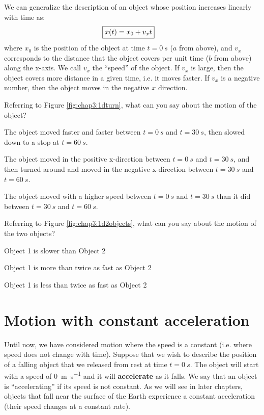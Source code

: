 We can generalize the description of an object whose position increases linearly with time as:
\begin{align}
\label{eqn:chap3:1dxvst_noa}
\Aboxed{x(t) = x_0 + v_xt}
\end{align}
where $x_0$ is the position of the object at time $t=\SI{0}{s}$ ($a$ from above), and $v_x$ corresponds to the distance that the object covers per unit time ($b$ from above) along the x-axis. We call $v_x$ the ``speed'' of the object. If $v_x$ is large, then the object covers more distance in a given time, i.e. it moves faster. If $v_x$ is a negative number, then the object moves in the negative $x$ direction.

\begin{checkpointMC}{Referring to Figure \ref{fig:chap3:1dturn}, what can you say about the motion of the object? }
\item The object moved faster and faster between $t=\SI{0}{s}$ and $t=\SI{30}{s}$, then slowed down to a stop at $t=\SI{60}{s}$.
\item The object moved in the positive x-direction between $t=\SI{0}{s}$ and $t=\SI{30}{s}$, and then turned around and moved in the negative x-direction between $t=\SI{30}{s}$ and $t=\SI{60}{s}$. %
\item The object moved with a higher speed between $t=\SI{0}{s}$ and $t=\SI{30}{s}$ than it did between $t=\SI{30}{s}$ and $t=\SI{60}{s}$.
\end{checkpointMC}

\begin{checkpointMC}{Referring to Figure \ref{fig:chap3:1d2objects}, what can you say about the motion of the two objects? }
\item Object 1 is slower than Object 2
\item Object 1 is more than twice as fast as Object 2 %
\item Object 1 is less than twice as fast as Object 2
\end{checkpointMC}

\section{Motion with constant acceleration}
Until now, we have considered motion where the speed is a constant (i.e. where speed does not change with time). Suppose that we wish to describe the position of a falling object that we released from rest at time $t=\SI{0}{s}$. The object will start with a speed of \SI{0}{m\per s} and it will \textbf{accelerate} as it falls. We say that an object is ``accelerating'' if its speed is not constant. As we will see in later chapters, objects that fall near the surface of the Earth experience a constant acceleration (their speed changes at a constant rate).

